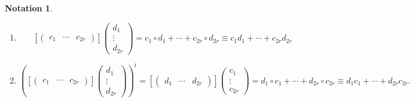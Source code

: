 \documentclass[aps,preprint]{revtex4}
\newtheorem{notation}[theorem]{Notation}
\begin{document}
\begin{notation}
\begin{enumerate}
\begin{enumerate}
\item 
\begin{equation}
\left[ \left( 
\begin{array}{ccc}
c_{1} & \cdots & c_{2r}%
\end{array}%
\right) \right] \left( 
\begin{array}{c}
d_{1} \\ 
\vdots \\ 
d_{2r}%
\end{array}%
\right) =c_{1}\circ d_{1}+\cdots +c_{2r}\circ d_{2r}\equiv c_{1}d_{1}+\cdots
+c_{2r}d_{2r}
\end{equation}

\item 
\begin{equation}
\left( \left[ \left( 
\begin{array}{ccc}
c_{1} & \cdots & c_{2r}%
\end{array}%
\right) \right] \left( 
\begin{array}{c}
d_{1} \\ 
\vdots \\ 
d_{2r}%
\end{array}%
\right) \right) ^{t}=\left[ \left( 
\begin{array}{ccc}
d_{1} & \cdots & d_{2r}%
\end{array}%
\right) \right] \left( 
\begin{array}{c}
c_{1} \\ 
\vdots \\ 
c_{2r}%
\end{array}%
\right) =d_{1}\circ c_{1}+\cdots +d_{2r}\circ c_{2r}\equiv d_{1}c_{1}+\cdots
+d_{2r}c_{2r}.
\end{equation}
\end{enumerate}
\end{enumerate}
\end{notation}
\end{document}
